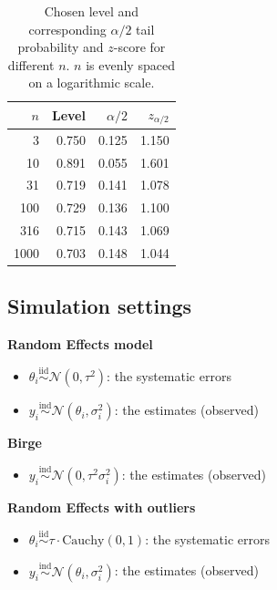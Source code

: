 \documentclass[12pt]{article}
\begin{document}
\begin{table}[H]
\centering
\caption{Chosen level and corresponding $\alpha/2$ tail probability and $z$-score for different $n$. $n$ is evenly spaced on a logarithmic scale.}
\label{tab:table-n}
\begin{tabular}{rrrr}
\hline
$n$ & Level & $\alpha/2$ & $z_{\alpha/2}$ \\
\hline
3 & 0.750 & 0.125 & 1.150 \\
10 & 0.891 & 0.055 & 1.601 \\
31 & 0.719 & 0.141 & 1.078 \\
100 & 0.729 & 0.136 & 1.100 \\
316 & 0.715 & 0.143 & 1.069 \\
1000 & 0.703 & 0.148 & 1.044 \\
\hline
\end{tabular}  

\end{table}

\subsection{Simulation settings}\label{simulation-settings}

\textbf{Random Effects model}

\begin{itemize}
\item
  $\theta_i\overset{\mathrm{iid}}{\sim}\mathcal{N}(0,\tau^2)$: the systematic errors
\item
  $y_i\overset{\mathrm{ind}}{\sim}\mathcal{N}(\theta_i,\sigma_i^2)$: the estimates (observed)
\end{itemize}

\textbf{Birge}

\begin{itemize}

\item
  $y_i\overset{\mathrm{ind}}{\sim}\mathcal{N}(0,\tau^2\sigma_i^2)$: the estimates (observed)
\end{itemize}

\textbf{Random Effects with outliers}

\begin{itemize}
\item
  $\theta_i\overset{\mathrm{iid}}{\sim}\tau\cdot \mathrm{Cauchy}(0,1)$: the systematic errors
\item
  $y_i\overset{\mathrm{ind}}{\sim}\mathcal{N}(\theta_i,\sigma_i^2)$: the estimates (observed)
\end{itemize}
\end{document}
